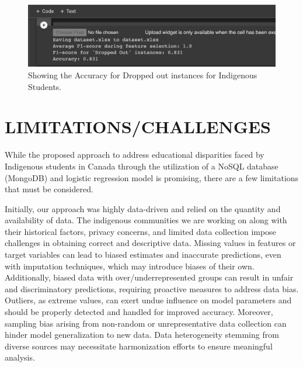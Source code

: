 \documentclass[a4paper,twoside]{article}
\begin{document}
\begin{figure}[!htb]
	\centering 
	\includegraphics[width=1.0\linewidth,keepaspectratio]{images/Result.png}
        \captionsetup{format=plain, justification=centering}
	\caption{Showing the Accuracy for Dropped out instances for Indigenous Students.} 
	\label{fig:result}
\end{figure}


\section{\uppercase{Limitations/Challenges}}
While the proposed approach to address educational disparities faced by Indigenous students in Canada through the utilization of a NoSQL database (MongoDB) and logistic regression model is promising, there are a few limitations that must be considered.

Initially, our approach was highly data-driven and relied on the quantity and availability of data. The indigenous communities we are working on along with their historical factors, privacy concerns, and limited data collection impose challenges in obtaining correct and descriptive data. Missing values in features or target variables can lead to biased estimates and inaccurate predictions, even with imputation techniques, which may introduce biases of their own. Additionally, biased data with over/underrepresented groups can result in unfair and discriminatory predictions, requiring proactive measures to address data bias. Outliers, as extreme values, can exert undue influence on model parameters and should be properly detected and handled for improved accuracy. Moreover, sampling bias arising from non-random or unrepresentative data collection can hinder model generalization to new data. Data heterogeneity stemming from diverse sources may necessitate harmonization efforts to ensure meaningful analysis.
\end{document}
